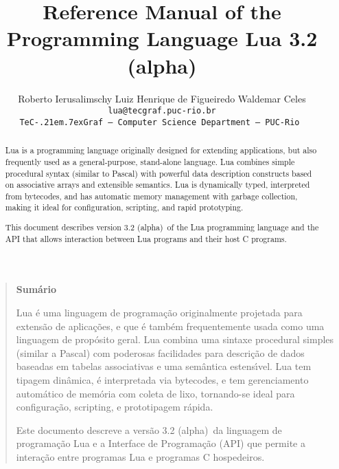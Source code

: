 \documentclass[11pt]{article}
\def\tecgraf{{\sf TeC\kern-.21em\lower.7ex\hbox{Graf}}}
\newcommand{\Version}{3.2 (alpha)}
\begin{document}
\title{Reference Manual of the Programming Language Lua \Version}

\author{%
Roberto Ierusalimschy\quad
Luiz Henrique de Figueiredo\quad
Waldemar Celes
\vspace{1.0ex}\\
\smallskip
\small\tt lua@tecgraf.puc-rio.br
\vspace{2.0ex}\\
\tecgraf\ --- Computer Science Department --- PUC-Rio
}


\maketitle

\thispagestyle{empty}
\pagestyle{empty}

\begin{abstract}
\noindent
Lua is a programming language originally designed for extending applications,
but also frequently used as a general-purpose, stand-alone language.
Lua combines simple procedural syntax (similar to Pascal)
with powerful data description constructs based on associative
arrays and extensible semantics.
Lua is dynamically typed, interpreted from bytecodes,
and has automatic memory management with garbage collection,
making it ideal for configuration, scripting, and rapid prototyping. 

This document describes version \Version\ of the Lua programming language
and the API that allows interaction between Lua programs and their
host C programs.
\end{abstract}
\vspace{4ex}
\begin{quotation}
\small
\begin{center}{\bf Sum\'ario}\end{center}
\vspace{1ex}
\noindent
Lua \'e uma linguagem de programa\c{c}\~ao originalmente projetada para
extens\~ao de aplica\c{c}\~oes,
e que \'e tamb\'em frequentemente usada como uma linguagem de
prop\'osito geral.
Lua combina uma sintaxe procedural simples (similar a Pascal)
com poderosas facilidades para descri\c{c}\~ao de dados baseadas
em tabelas associativas e uma sem\^antica estens\'{\i}vel. 
Lua tem tipagem din\^amica, \'e interpretada via bytecodes,
e tem gerenciamento autom\'atico de mem\'oria com coleta de lixo,
tornando-se ideal para configura\c{c}\~ao, scripting,
e prototipagem r\'apida.

Este documento descreve a vers\~ao \Version\ da linguagem de
programa\c{c}\~ao Lua e a Interface de Programa\c{c}\~ao (API) que permite
a intera\c{c}\~ao entre programas Lua e programas C hospedeiros.
\end{quotation}
\end{document}
